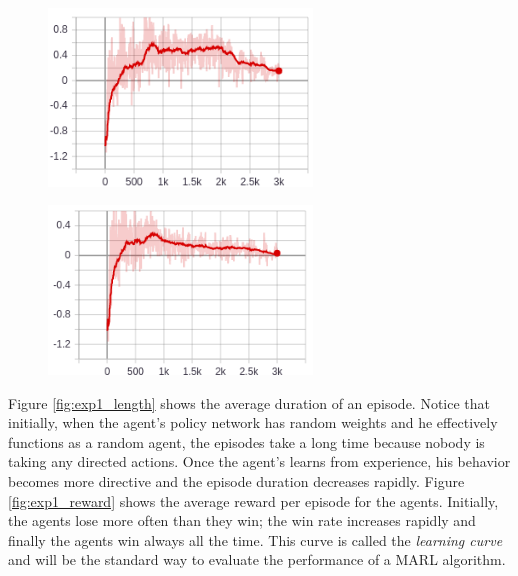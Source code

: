 \begin{figure}
\centering
\begin{minipage}{.5\textwidth}
  \centering
  \includegraphics[width=7cm]{images/experiment1/loss_T0.png}
  \label{fig:exp1_loss0}
\end{minipage}%
\begin{minipage}{.5\textwidth}
  \centering
  \includegraphics[width=7cm]{images/experiment1/loss_T1.png}
  \label{fig:exp1_loss1}
\end{minipage}
\end{figure}

Figure \ref{fig:exp1_length} shows the average duration of an episode. Notice that initially, when the agent's policy network has random weights and he effectively functions as a random agent, the episodes take a long time because nobody is taking any directed actions. Once the agent's learns from experience, his behavior becomes more directive and the episode duration decreases rapidly. Figure \ref{fig:exp1_reward} shows the average reward per episode for the agents. Initially, the agents lose more often than they win; the win rate increases rapidly and finally the agents win always all the time. This curve is called the \emph{learning curve} and will be the standard way to evaluate the performance of a MARL algorithm.

